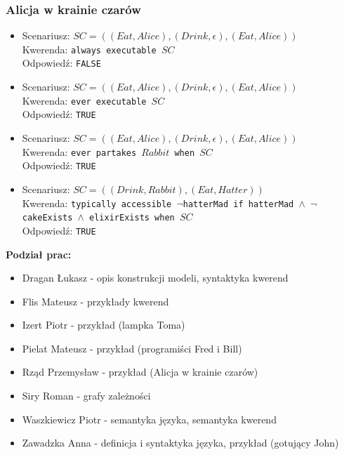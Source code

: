 \documentclass{article}
\begin{document}
\subsubsection{Alicja w krainie czarów}
\begin{itemize}
\item
Scenariusz: $SC=((Eat,Alice),(Drink,\epsilon),(Eat,Alice))$\\
Kwerenda: {\large\texttt{always executable $SC$}}\\
Odpowiedź: \texttt{FALSE}
\item
Scenariusz: $SC=((Eat,Alice),(Drink,\epsilon),(Eat,Alice))$\\
Kwerenda: {\large\texttt{ever executable $SC$}}\\
Odpowiedź: \texttt{TRUE}
\item
Scenariusz: $SC=((Eat,Alice),(Drink,\epsilon),(Eat,Alice))$\\
Kwerenda: {\large\texttt{ever partakes $Rabbit$ when $SC$}}\\
Odpowiedź: \texttt{TRUE}
\item
Scenariusz: $SC=((Drink,Rabbit),(Eat,Hatter))$\\
Kwerenda: {\large\texttt{typically accessible $\neg$hatterMad if hatterMad $\wedge$ $\neg$cakeExists $\wedge$ elixirExists when $SC$}}\\
Odpowiedź: \texttt{TRUE}
\end{itemize}
\newpage
\textbf{Podział prac:}
\begin{itemize}
    \item Dragan Łukasz - opis konstrukcji modeli, syntaktyka kwerend
    \item Flis Mateusz - przykłady kwerend 
    \item Izert Piotr - przykład (lampka Toma) 
    \item Pielat Mateusz - przykład (programiści Fred i Bill) 
    \item Rząd Przemysław - przykład (Alicja w krainie czarów)
    \item Siry Roman - grafy zależności 
    \item Waszkiewicz Piotr - semantyka języka, semantyka kwerend 
    \item Zawadzka Anna - definicja i syntaktyka języka, przykład (gotujący John)
\end{itemize}
\end{document}
